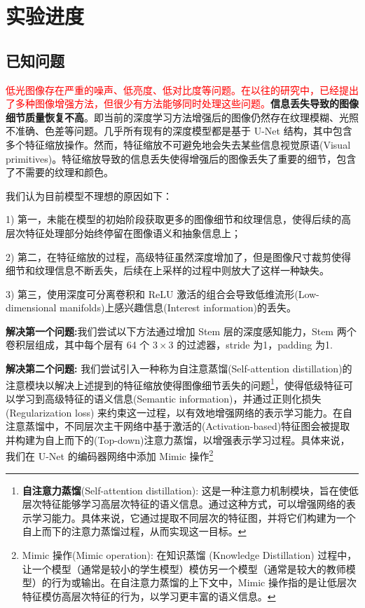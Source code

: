 \documentclass[a4paper]{ctexart}
\begin{document}
	\section{实验进度}
		
		\subsection*{已知问题}
		
		\textcolor{red}{低光图像存在严重的噪声、低亮度、低对比度等问题。在以往的研究中，已经提出了多种图像增强方法，但很少有方法能够同时处理这些问题。}\textbf{信息丢失导致的图像细节质量恢复不高}\cite{zhang2023frc}。即当前的深度学习方法增强后的图像仍然存在纹理模糊、光照不准确、色差等问题。几乎所有现有的深度模型都是基于 U-Net 结构，其中包含多个特征缩放操作\cite{ronneberger2015u}。然而，特征缩放不可避免地会失去某些信息视觉原语(Visual primitives)\cite{zhang2021accurate}。特征缩放导致的信息丢失使得增强后的图像丢失了重要的细节，包含了不需要的纹理和颜色。
		
		我们认为目前模型不理想的原因如下：
		
		1) 第一，未能在模型的初始阶段获取更多的图像细节和纹理信息，使得后续的高层次特征处理部分始终停留在图像语义和抽象信息上；
		
		2) 第二，在特征缩放的过程，高级特征虽然深度增加了，但是图像尺寸裁剪使得细节和纹理信息不断丢失，后续在上采样的过程中则放大了这样一种缺失。
		
		3) 第三，使用深度可分离卷积和 ReLU 激活的组合会导致低维流形(Low-dimensional manifolds)上感兴趣信息(Interest information)的丢失\cite{sandler2018mobilenetv2}。
		 
		\textbf{解决第一个问题:}我们尝试以下方法通过增加 Stem 层的深度感知能力，Stem 两个卷积层组成，其中每个层有 64 个 $3 \times 3$ 的过滤器，stride 为1，padding 为1.
		
		\textbf{解决第二个问题:}
		我们尝试引入一种称为自注意蒸馏(Self-attention distillation)的注意模块\cite{guo2019pipeline}以解决上述提到的特征缩放使得图像细节丢失的问题\footnote{\textbf{自注意力蒸馏}(Self-attention distillation): 这是一种注意力机制模块，旨在使低层次特征能够学习高层次特征的语义信息。通过这种方式，可以增强网络的表示学习能力。具体来说，它通过提取不同层次的特征图，并将它们构建为一个自上而下的注意力蒸馏过程，从而实现这一目标。}，使得低级特征可以学习到高级特征的语义信息(Semantic information)，并通过正则化损失 (Regularization loss) 来约束这一过程，以有效地增强网络的表示学习能力。在自注意蒸馏中，不同层次主干网络中基于激活的(Activation-based)特征图会被提取并构建为自上而下的(Top-down)注意力蒸馏，以增强表示学习过程。具体来说，我们在 U-Net 的编码器网络中添加 Mimic 操作\footnote{Mimic 操作(Mimic operation): 在知识蒸馏 (Knowledge Distillation) 过程中，让一个模型（通常是较小的学生模型）模仿另一个模型（通常是较大的教师模型）的行为或输出。在自注意力蒸馏的上下文中，Mimic 操作指的是让低层次特征模仿高层次特征的行为，以学习更丰富的语义信息。}
		
\end{document}

